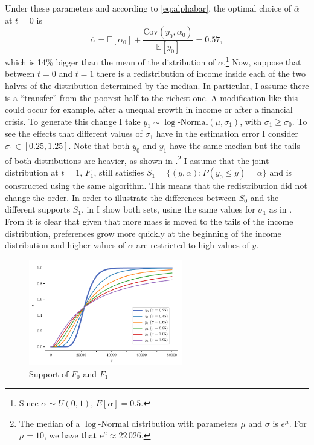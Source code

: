 \documentclass[english, a4paper,12pt]{article}
\begin{document}
Under these parameters and according to \eqref{eq:alphabar}, the optimal choice of $\overline{\alpha}$ at $t = 0$ is
	\begin{equation} \label{eq:exAlphaBar}
		\overline{\alpha} 
			= \mathbb{E}[\alpha_{0}] + \frac{\mathrm{Cov}(y_{0}, \alpha_{0})}{\mathbb{E}[y_{0}]}
			= 0.57,
	\end{equation}
which is 14\% bigger than the mean of the distribution of $\alpha$.\footnote{Since $\alpha \sim U(0,1)$, $E[\alpha] = 0.5$.} Now, suppose that between $t = 0$ and $t = 1$ there is a redistribution of income inside each of the two halves of the distribution determined by the median. In particular, I assume there is a ``transfer'' from the poorest half to the richest one. A modification like this could occur for example, after a unequal growth in income or after a financial crisis. To generate this change I take $y_{1} \sim \log\text{-Normal}(\mu, \sigma_{1})$, with $\sigma_{1} \geq \sigma_{0}$. To see the effects that different values of $\sigma_{1}$ have in the estimation error I consider $\sigma_{1} \in [0.25, 1.25]$. Note that both $y_{0}$ and $y_{1}$ have the same median but the tails of both distributions are heavier, as shown in .\footnote{The median of a $\log$-Normal distribution with parameters $\mu$ and $\sigma$ is $e^{\mu}$. For $\mu = 10$, we have that $e^{\mu} \approx 22\,026$.} I assume that the joint distribution at $t = 1$, $F_{1}$, still satisfies $S_{1} = \{(y,\alpha) : P(y_{0} \leq y) = \alpha\}$ and is constructed using the same algorithm. This means that the redistribution did not change the order. In order to illustrate the differences between $S_{0}$ and the different supports $S_{1}$, in  I show both sets, using the same values for $\sigma_{1}$ as in . From  it is clear that given that more mass is moved to the tails of the income distribution, preferences grow more quickly at the beginning of the income distribution and higher values of $\alpha$ are restricted to high values of $y$.
	\begin{figure}[H] 
		\caption{Support of $F_{0}$ and $F_{1}$}
		\label{fig:JointDistributions}
		\includegraphics[width = 0.6\textwidth]{RAjointDistribs}
	\end{figure}
\end{document}
